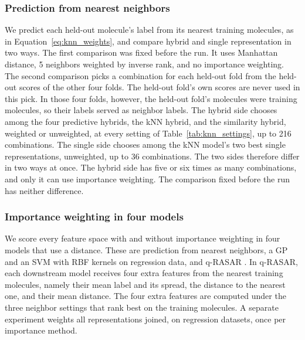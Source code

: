 \subsubsection{Prediction from nearest neighbors}
We predict each held-out molecule's label from its nearest training molecules, as in Equation~\ref{eq:knn_weights}, and compare hybrid and single representation in two ways. The first comparison was fixed before the run. It uses Manhattan distance, 5 neighbors weighted by inverse rank, and no importance weighting. The second comparison picks a combination for each held-out fold from the held-out scores of the other four folds. The held-out fold's own scores are never used in this pick. In those four folds, however, the held-out fold's molecules were training molecules, so their labels served as neighbor labels. The hybrid side chooses among the four predictive hybrids, the kNN hybrid, and the similarity hybrid, weighted or unweighted, at every setting of Table~\ref{tab:knn_settings}, up to 216 combinations. The single side chooses among the kNN model's two best single representations, unweighted, up to 36 combinations. The two sides therefore differ in two ways at once. The hybrid side has five or six times as many combinations, and only it can use importance weighting. The comparison fixed before the run has neither difference.

\subsubsection{Importance weighting in four models}
We score every feature space with and without importance weighting in four models that use a distance. These are prediction from nearest neighbors, a GP and an SVM with RBF kernels on regression data, and q-RASAR \citep{Banerjee2022}. In q-RASAR, each downstream model receives four extra features from the nearest training molecules, namely their mean label and its spread, the distance to the nearest one, and their mean distance. The four extra features are computed under the three neighbor settings that rank best on the training molecules. A separate experiment weights all representations joined, on regression datasets, once per importance method.

